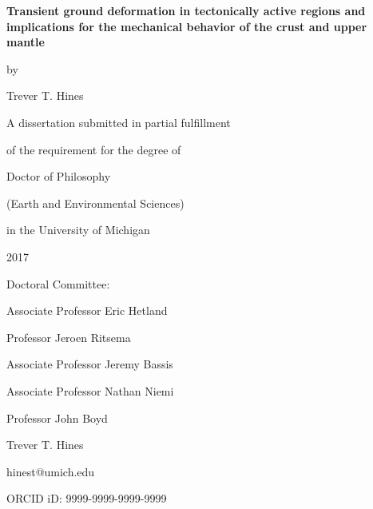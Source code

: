 \documentclass[letterpaper,12pt,oneside]{book}
\begin{document}
\frontmatter %

\thispagestyle{empty} %
\begin{center}
\vspace*{1.0in}
\textbf{\large{Transient ground deformation in tectonically active regions and implications for the mechanical behavior of the crust and upper mantle}}

\vspace*{0.25in}
by

\vspace*{0.25in}
Trever T. Hines 

\vspace*{2.0in}
A dissertation submitted in partial fulfillment

of the requirement for the degree of 

Doctor of Philosophy

(Earth and Environmental Sciences)

in the University of Michigan

2017
\end{center}
\vspace*{1.0in}
Doctoral Committee:

\vspace*{0.1in}
\hspace*{0.2in}
Associate Professor Eric Hetland

\hspace*{0.2in}
Professor Jeroen Ritsema

\hspace*{0.2in}
Associate Professor Jeremy Bassis

\hspace*{0.2in}
Associate Professor Nathan Niemi

\hspace*{0.2in}
Professor John Boyd

\newpage

\thispagestyle{empty} %
\begin{center}
\vspace*{1.0in}
Trever T. Hines

hinest@umich.edu

ORCID iD: 9999-9999-9999-9999
\end{center}
\newpage
\end{document}

